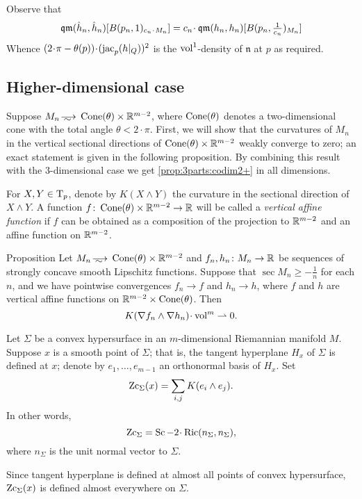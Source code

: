 Observe that 
\[\qm(\hat h_n, \hat h_n)[B(p_n,1)_{c_n\cdot M_n}]
=
c_n\cdot \qm(h_n, h_n)[B(p_n,\tfrac1{c_n})_{M_n}]\]
Whence $(2\cdot \pi-\theta(p))\cdot(\jac_p(h|_Q))^2$ is the $\operatorname{vol}^1$-density of $\mathfrak n$ at $p$ as required.
\qeds

\subsection{Higher-dimensional case}\label{subsec:4d}


Suppose $M_n\smooths{} \Cone(\theta)\times \RR^{m-2}$, where $\operatorname{Cone}(\theta)$ denotes a two-dimensional cone with the total angle $\theta<2\cdot\pi$.
First, we will show that the curvatures of $M_n$ in the vertical sectional directions of $\operatorname{Cone}(\theta)\times \mathbb{R}^{m-2}$ weakly converge to zero;
an exact statement is given in the following proposition.
By combining this result with the 3-dimensional case we get \ref{prop:3parts:codim2+} in all dimensions.

For $X,Y\in \mathrm{T}_p$, denote by $K(X\wedge Y)$ the curvature in the sectional direction of $X\wedge Y$.
A function $f\colon\operatorname{Cone}(\theta)\times\mathbb{R}^{m-2}\to\mathbb{R}$ will be called a \emph{vertical affine function} if $f$ can be obtained as a composition of the projection to $\mathbb{R}^{m-2}$ and an affine function on $\mathbb{R}^{m-2}$.

\begin{thm}{Proposition}\label{prop:vert-vert}
Let $M_n\smooths{} \Cone(\theta)\times\RR^{m-2}$
and $f_n,h_n\: M_n\zz\to \RR$ be sequences of strongly concave smooth Lipschitz functions.
Suppose that $\sec M_n\ge -\tfrac1n$ for each $n$,
and we have pointwise convergences $f_n\to f$ and $h_n\to h$, where $f$ and $h$ are vertical affine functions on $\mathbb{R}^{m-2}\times \operatorname{Cone}(\theta)$.
Then 
\[K(\nabla f_n\wedge\nabla h_n)\cdot\vol^m \rightharpoonup0.\]

\end{thm}

Let $\Sigma$ be a convex hypersurface in an $m$-dimensional Riemannian manifold $M$.
Suppose $x$ is a smooth point of $\Sigma$; that is, the tangent hyperplane $H_x$ of $\Sigma$ is defined at $x$;
denote by $e_1,\dots,e_{m-1}$ an orthonormal basis of $H_x$.
Set 
\[\operatorname{\rm Zc}_\Sigma(x)= \sum_{i,j} K(e_i\wedge e_j).\]
In other words, 
\[\Zc_\Sigma=\Sc-2\cdot\Ric(n_\Sigma,n_\Sigma),\]
where $n_\Sigma$ is the unit normal vector to $\Sigma$.

Since tangent hyperplane is defined at almost all points of convex hypersurface,
 $\operatorname{\rm Zc}_\Sigma(x)$ is defined almost everywhere on $\Sigma$.

